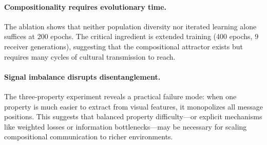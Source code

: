 \documentclass[11pt,a4paper]{article}
\begin{document}
\paragraph{Compositionality requires evolutionary time.}
The ablation shows that neither population diversity nor iterated learning alone suffices at 200 epochs.
The critical ingredient is extended training (400 epochs, 9 receiver generations), suggesting that the compositional attractor exists but requires many cycles of cultural transmission to reach.

\paragraph{Signal imbalance disrupts disentanglement.}
The three-property experiment reveals a practical failure mode: when one property is much easier to extract from visual features, it monopolizes all message positions.
This suggests that balanced property difficulty---or explicit mechanisms like weighted losses or information bottlenecks---may be necessary for scaling compositional communication to richer environments.

\end{document}
